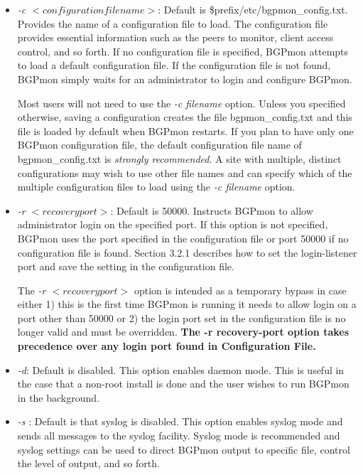\begin{itemize}

\item{\emph{-c $<configuration filename>$}: Default is \$prefix/etc/bgpmon\_config.txt.   Provides the name of a configuration file to load.     The configuration file provides essential information such as the peers to monitor, client access control,  and so forth.    If no configuration file is specified, BGPmon attempts to load a default configuration file.   If the configuration file is not found, BGPmon simply waits for an administrator to login and configure BGPmon.

Most users will not need to use the \emph{-c filename} option.    Unless you specified otherwise,  saving a configuration creates the file bgpmon\_config.txt and this file is loaded by default when BGPmon restarts.    If you plan to have only one BGPmon configuration file,  the default configuration file name of bgpmon\_config.txt is \emph{strongly recommended}.    A site with multiple, distinct configurations may wish to use other file names and can specify which of the multiple configuration files to load using the \emph{-c filename} option.
}

\item{\emph{-r $<recovery port>$}: Default is 50000. Instructs BGPmon to allow administrator login on the specified port.
If this option is not specified, BGPmon uses the port specified in the configuration file or port 50000 if no configuration
file is found. Section 3.2.1 describes how to set the login-listener port and save the setting in the
configuration file.

The \emph{-r $<recovery port>$} option is intended as a temporary bypass in case either 1) this is the first time
BGPmon is running it needs to allow login on a port other than 50000 or 2) the login port set in the
configuration file is no longer valid and must be overridden. \textbf{The -r recovery-port option takes
precedence over any login port found in Configuration File.}
}

\item{\emph{-d}: Default is disabled. This option enables daemon mode. This is useful in the case that a non-root install is done and the user wishes to run BGPmon in the background.
}

\item{\emph{-s} : Default is that syslog is disabled.  This option enables syslog mode and sends all messages to the syslog facility.
Syslog mode is recommended and syslog settings can be used to direct BGPmon output to specific file,  control the level of output, and so forth.  

}
\end{itemize}
